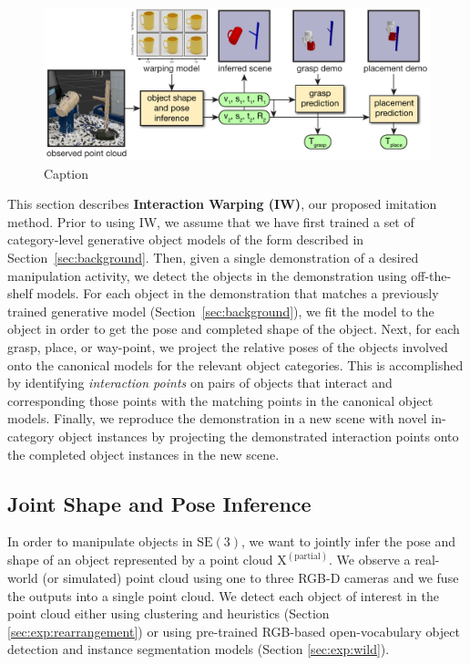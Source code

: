 \documentclass{article}
\newcommand{\pcx}[1]{\mathrm{X}^{(#1)}}
\begin{document}
\begin{figure}
    \centering
    \includegraphics[width=\textwidth]{figures/main_figure2.pdf}
    \caption{Caption}
    \label{fig:enter-label}
\end{figure}

This section describes \textbf{Interaction Warping (IW)}, our proposed imitation method. Prior to using IW, we assume that we have first trained a set of category-level generative object models of the form described in Section~\ref{sec:background}. Then, given a single demonstration of a desired manipulation activity, we detect the objects in the demonstration using off-the-shelf models. For each object in the demonstration that matches a previously trained generative model (Section~\ref{sec:background}), we fit the model to the object in order to get the pose and completed shape of the object. Next, for each grasp, place, or way-point, we project the relative poses of the objects involved onto the canonical models for the relevant object categories. This is accomplished by identifying \emph{interaction points} on pairs of objects that interact and corresponding those points with the matching points in the canonical object models. Finally, we reproduce the demonstration in a new scene with novel in-category object instances by projecting the demonstrated interaction points onto the completed object instances in the new scene.

\subsection{Joint Shape and Pose Inference}
\label{sec:methods:scene}

In order to manipulate objects in $\mathrm{SE}(3)$, we want to jointly infer the pose and shape of an object represented by a point cloud $\pcx{\mathrm{partial}}$. We observe a real-world (or simulated) point cloud using one to three RGB-D cameras and we fuse the outputs into a single point cloud. We detect each object of interest in the point cloud either using clustering and heuristics (Section \ref{sec:exp:rearrangement}) or using pre-trained RGB-based open-vocabulary object detection and instance segmentation models (Section \ref{sec:exp:wild}).
\end{document}
